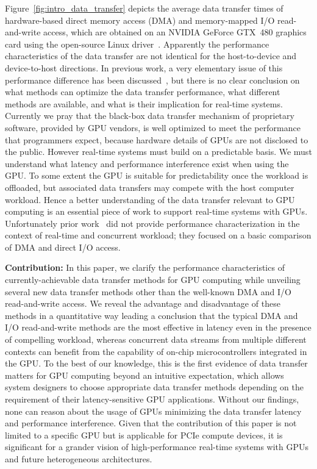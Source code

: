 Figure~\ref{fig:intro_data_transfer} depicts the average data transfer
times of hardware-based direct memory access (DMA) and memory-mapped I/O
read-and-write access, which are obtained on an NVIDIA GeForce GTX~480
graphics card using the open-source Linux driver~\cite{Kato_ATC12}.
Apparently the performance characteristics of the data transfer are not
identical for the host-to-device and device-to-host directions.
In previous work, a very elementary issue of this performance difference
has been discussed~\cite{Kato_ATC12}, but there is no clear conclusion
on what methods can optimize the data transfer performance, what
different methods are available, and what is their implication for
real-time systems.
Currently we pray that the black-box data transfer mechanism of
proprietary software, provided by GPU vendors, is well optimized to
meet the performance that programmers expect, because hardware details
of GPUs are not disclosed to the public.
However real-time systems must build on a predictable basis.
We must understand what latency and performance interference exist when
using the GPU.
To some extent the GPU is suitable for predictability once the workload
is offloaded, but associated data transfers may compete with the
host computer workload.
Hence a better understanding of the data transfer relevant to GPU
computing is an essential piece of work to support real-time systems
with GPUs.
Unfortunately prior work~\cite{Kato_ATC12, Kato_ICCPS13} did not provide
performance characterization in the context of real-time and
concurrent workload; they focused on a basic comparison of DMA and
direct I/O access.

\textbf{Contribution:}
In this paper, we clarify the performance characteristics of
currently-achievable data transfer methods for GPU computing while
unveiling several new data transfer methods other than the well-known
DMA and I/O read-and-write access.
We reveal the advantage and disadvantage of these methods in a
quantitative way leading a conclusion that the typical DMA and I/O
read-and-write methods are the most effective in latency even in the
presence of compelling workload, whereas concurrent data streams from
multiple different contexts can benefit from the capability of on-chip
microcontrollers integrated in the GPU.
To the best of our knowledge, this is the first evidence of data
transfer matters for GPU computing beyond an intuitive expectation,
which allows system designers to choose appropriate data transfer
methods depending on the requirement of their latency-sensitive GPU
applications.
Without our findings, none can reason about the usage of GPUs minimizing
the data transfer latency and performance interference.
Given that the contribution of this paper is not limited to a specific
GPU but is applicable for PCIe compute devices, it is significant for a
grander vision of high-performance real-time systems with GPUs and
future heterogeneous architectures.

